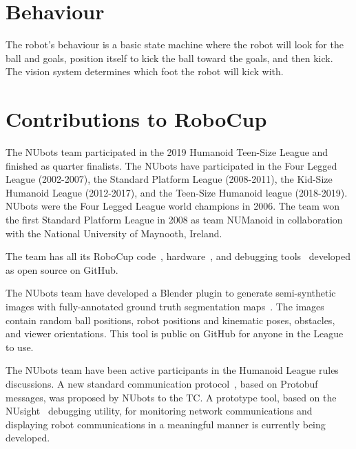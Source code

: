\documentclass{llncs}
\begin{document}
\medskip

\section{Behaviour}


The robot's behaviour is a basic state machine where the robot will look for the ball and goals, position itself to kick the ball toward the goals, and then kick. The vision system determines which foot the robot will kick with. 

\medskip

\section{Contributions to RoboCup}


The NUbots team participated in the 2019 Humanoid Teen-Size League and finished as quarter finalists. The NUbots have participated in the Four Legged League (2002-2007), the Standard Platform League (2008-2011), the Kid-Size Humanoid League (2012-2017), and the Teen-Size Humanoid league (2018-2019). NUbots were the Four Legged League world champions in 2006. The team won the first Standard Platform League in 2008 as team NUManoid in collaboration with the National University of Maynooth, Ireland.

The team has all its RoboCup code~\cite{nubotsGit}, hardware~\cite{nubotsHardwareGit}, and debugging tools~\cite{nubotsNUsightGit} developed as open source on GitHub. 

The NUbots team have developed a Blender plugin to generate semi-synthetic images with fully-annotated ground truth segmentation maps~\cite{nubotsNUpbrGit}. The images contain random ball positions, robot positions and kinematic poses, obstacles, and viewer orientations. This tool is public on GitHub for anyone in the League to use.

The NUbots team have been active participants in the Humanoid League rules discussions. A new standard communication protocol~\cite{nubotsProtocolGit}, based on Protobuf messages, was proposed by NUbots to the TC. A prototype tool, based on the NUsight~\cite{nubotsNUsightGit} debugging utility, for monitoring network communications and displaying robot communications in a meaningful manner is currently being developed.
\end{document}
